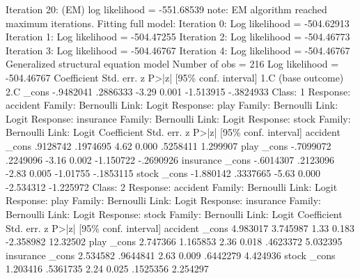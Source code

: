 Iteration 20: (EM) log likelihood = -551.68539
note: EM algorithm reached maximum iterations.
{\smallskip}
Fitting full model:
{\smallskip}
Iteration 0:  Log likelihood = -504.62913  
Iteration 1:  Log likelihood = -504.47255  
Iteration 2:  Log likelihood = -504.46773  
Iteration 3:  Log likelihood = -504.46767  
Iteration 4:  Log likelihood = -504.46767  
{\smallskip}
Generalized structural equation model                      Number of obs = 216
Log likelihood = -504.46767
{\smallskip}
             {\VBAR} Coefficient  Std. err.      z    P>|z|     [95\% conf. interval]
1.C          {\VBAR}  (base outcome)
2.C          {\VBAR}
       _cons {\VBAR}  -.9482041   .2886333    -3.29   0.001    -1.513915   -.3824933
{\smallskip}
Class:    1        
{\smallskip}
Response: accident 
Family:   Bernoulli
Link:     Logit    
{\smallskip}
Response: play     
Family:   Bernoulli
Link:     Logit    
{\smallskip}
Response: insurance
Family:   Bernoulli
Link:     Logit    
{\smallskip}
Response: stock    
Family:   Bernoulli
Link:     Logit    
{\smallskip}
             {\VBAR} Coefficient  Std. err.      z    P>|z|     [95\% conf. interval]
accident     {\VBAR}
       _cons {\VBAR}   .9128742   .1974695     4.62   0.000     .5258411    1.299907
play         {\VBAR}
       _cons {\VBAR}  -.7099072   .2249096    -3.16   0.002    -1.150722   -.2690926
insurance    {\VBAR}
       _cons {\VBAR}  -.6014307   .2123096    -2.83   0.005     -1.01755   -.1853115
stock        {\VBAR}
       _cons {\VBAR}  -1.880142   .3337665    -5.63   0.000    -2.534312   -1.225972
{\smallskip}
Class:    2        
{\smallskip}
Response: accident 
Family:   Bernoulli
Link:     Logit    
{\smallskip}
Response: play     
Family:   Bernoulli
Link:     Logit    
{\smallskip}
Response: insurance
Family:   Bernoulli
Link:     Logit    
{\smallskip}
Response: stock    
Family:   Bernoulli
Link:     Logit    
{\smallskip}
             {\VBAR} Coefficient  Std. err.      z    P>|z|     [95\% conf. interval]
accident     {\VBAR}
       _cons {\VBAR}   4.983017   3.745987     1.33   0.183    -2.358982    12.32502
play         {\VBAR}
       _cons {\VBAR}   2.747366   1.165853     2.36   0.018     .4623372    5.032395
insurance    {\VBAR}
       _cons {\VBAR}   2.534582   .9644841     2.63   0.009     .6442279    4.424936
stock        {\VBAR}
       _cons {\VBAR}   1.203416   .5361735     2.24   0.025     .1525356    2.254297
